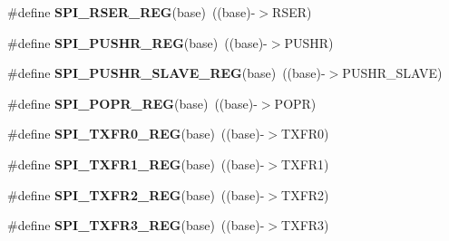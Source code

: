 \begin{DoxyCompactItemize}
\item 
\#define {\bfseries S\+P\+I\+\_\+\+R\+S\+E\+R\+\_\+\+R\+EG}(base)~((base)-\/$>$R\+S\+ER)\hypertarget{group__SPI__Register__Accessor__Macros_ga8f533d7434b45c8f009c8167748de39d}{}\label{group__SPI__Register__Accessor__Macros_ga8f533d7434b45c8f009c8167748de39d}

\item 
\#define {\bfseries S\+P\+I\+\_\+\+P\+U\+S\+H\+R\+\_\+\+R\+EG}(base)~((base)-\/$>$P\+U\+S\+HR)\hypertarget{group__SPI__Register__Accessor__Macros_gaa72e13724179a2f797827085b3ff1277}{}\label{group__SPI__Register__Accessor__Macros_gaa72e13724179a2f797827085b3ff1277}

\item 
\#define {\bfseries S\+P\+I\+\_\+\+P\+U\+S\+H\+R\+\_\+\+S\+L\+A\+V\+E\+\_\+\+R\+EG}(base)~((base)-\/$>$P\+U\+S\+H\+R\+\_\+\+S\+L\+A\+VE)\hypertarget{group__SPI__Register__Accessor__Macros_ga471bc13ac366b823f456b69188afeedf}{}\label{group__SPI__Register__Accessor__Macros_ga471bc13ac366b823f456b69188afeedf}

\item 
\#define {\bfseries S\+P\+I\+\_\+\+P\+O\+P\+R\+\_\+\+R\+EG}(base)~((base)-\/$>$P\+O\+PR)\hypertarget{group__SPI__Register__Accessor__Macros_gaf79eb9413589dba11d328fbee52c1716}{}\label{group__SPI__Register__Accessor__Macros_gaf79eb9413589dba11d328fbee52c1716}

\item 
\#define {\bfseries S\+P\+I\+\_\+\+T\+X\+F\+R0\+\_\+\+R\+EG}(base)~((base)-\/$>$T\+X\+F\+R0)\hypertarget{group__SPI__Register__Accessor__Macros_ga055ab0396fbd2b7e079ffa0df55110a5}{}\label{group__SPI__Register__Accessor__Macros_ga055ab0396fbd2b7e079ffa0df55110a5}

\item 
\#define {\bfseries S\+P\+I\+\_\+\+T\+X\+F\+R1\+\_\+\+R\+EG}(base)~((base)-\/$>$T\+X\+F\+R1)\hypertarget{group__SPI__Register__Accessor__Macros_ga9c7d3fda087668b4cb29054741f99d2f}{}\label{group__SPI__Register__Accessor__Macros_ga9c7d3fda087668b4cb29054741f99d2f}

\item 
\#define {\bfseries S\+P\+I\+\_\+\+T\+X\+F\+R2\+\_\+\+R\+EG}(base)~((base)-\/$>$T\+X\+F\+R2)\hypertarget{group__SPI__Register__Accessor__Macros_ga52c17a1852eb3b3e60d3204900a35f4f}{}\label{group__SPI__Register__Accessor__Macros_ga52c17a1852eb3b3e60d3204900a35f4f}

\item 
\#define {\bfseries S\+P\+I\+\_\+\+T\+X\+F\+R3\+\_\+\+R\+EG}(base)~((base)-\/$>$T\+X\+F\+R3)\hypertarget{group__SPI__Register__Accessor__Macros_ga6a2eb75190dd107d3cc223f886bcf370}{}\label{group__SPI__Register__Accessor__Macros_ga6a2eb75190dd107d3cc223f886bcf370}


\end{DoxyCompactItemize}

